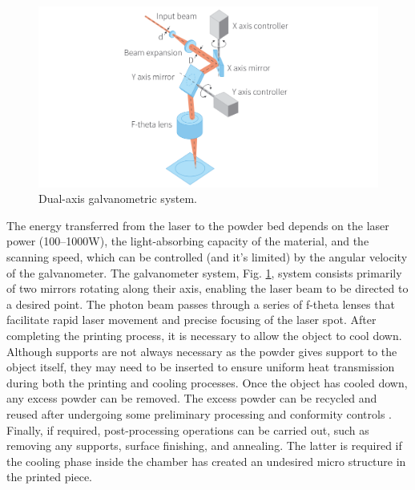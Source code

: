 \begin{figure}
    \centering
    \includegraphics[scale=0.45]{Images/galvanometro.png}
    \caption[Galvanometric system.]{Dual-axis galvanometric system.}
    \label{fig:galvano}
\end{figure}
The energy transferred from the laser to the powder bed depends on the laser power (\numrange[range-phrase = --]{100}{1000}\unit{\watt}), the light-absorbing capacity of the material, and the scanning speed, which can be controlled (and it's limited) by the angular velocity of the galvanometer. The galvanometer system, Fig. \ref{fig:galvano}, system consists primarily of two mirrors rotating along their axis, enabling the laser beam to be directed to a desired point. The photon beam passes through a series of f-theta lenses that facilitate rapid laser movement and precise focusing of the laser spot. After completing the printing process, it is necessary to allow the object to cool down. Although supports are not always necessary as the powder gives support to the object itself, they may need to be inserted to ensure uniform heat transmission during both the printing and cooling processes. Once the object has cooled down, any excess powder can be removed. The excess powder can be recycled and reused after undergoing some preliminary processing and conformity controls \cite{strondl_characterization_2015}. Finally, if required, post-processing operations can be carried out, such as removing any supports, surface finishing, and annealing. The latter is required if the cooling phase inside the chamber has created an undesired micro structure in the printed piece.

